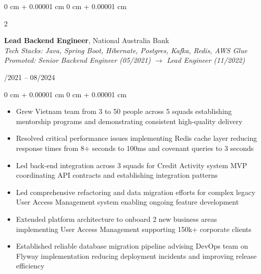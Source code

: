 \documentclass[10pt, letterpaper]{article}
\newenvironment{highlights}{
    \begin{itemize}[
        topsep=0.10 cm,
        parsep=0.10 cm,
        partopsep=0pt,
        itemsep=0pt,
        leftmargin=0 cm + 10pt
    ]
}{
    \end{itemize}
}
\newenvironment{onecolentry}{
    \begin{adjustwidth}{
        0 cm + 0.00001 cm
    }{
        0 cm + 0.00001 cm
    }
}{
    \end{adjustwidth}
}
\newenvironment{twocolentry}[2][]{
    \onecolentry
    \def\secondColumn{#2}
    \setcolumnwidth{\fill, 4.5 cm}
    \begin{paracol}{2}
}{
    \switchcolumn \raggedleft \secondColumn
    \end{paracol}
    \endonecolentry
}
\begin{document}
    \begin{twocolentry}{05/2021 -- 08/2024}
        \textbf{Lead Backend Engineer}, National Australia Bank\\
        \textit{Tech Stacks: Java, Spring Boot, Hibernate, Postgres, Kafka, Redis, AWS Glue}\\
        \textit{Promoted: Senior Backend Engineer (05/2021) $\rightarrow$ Lead Engineer (11/2022)}
    \end{twocolentry}
    \vspace{0.15cm}
    \begin{onecolentry}
        \begin{highlights}
            \item Grew Vietnam team from 3 to 50 people across 5 squads establishing mentorship programs and demonstrating consistent high-quality delivery
            \item Resolved critical performance issues implementing Redis cache layer reducing response times from 8+ seconds to 100ms and covenant queries to 3 seconds
            \item Led back-end integration across 3 squads for Credit Activity system MVP coordinating API contracts and establishing integration patterns
            \item Led comprehensive refactoring and data migration efforts for complex legacy User Access Management system enabling ongoing feature development
            \item Extended platform architecture to onboard 2 new business areas implementing User Access Management supporting 150k+ corporate clients
            \item Established reliable database migration pipeline advising DevOps team on Flyway implementation reducing deployment incidents and improving release efficiency
        \end{highlights}
    \end{onecolentry}
    \vspace{0.3cm}
\end{document}
